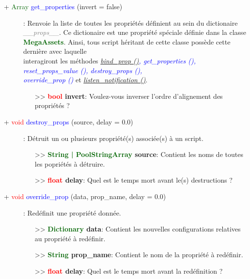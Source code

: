 \documentclass[a4paper, 11pt]{article}
\begin{document}
	\begin{description}
		\item [+ \textcolor{darkgreen}{Array} \textcolor{blue}{get\_properties} (invert = false)]: Renvoie 
		la liste de toutes les propriétés définient au sein du dictionaire \textit{\textcolor {gray}
		{\_\_props\_\_}}. Ce dictionaire est une propriété spéciale définie dans la classe 
		\textbf{\textcolor {darkgreen}{\\MegaAssets}}. Ainsi, tous script héritant de cette classe possède 
		cette dernière avec laquelle \\interagiront les méthodes \textit{\textcolor {blue}
		{\hyperlink{bindprop}{bind\_prop ()}, get\_properties (), reset\_props\_value (), destroy\_props (), 
		\\override\_prop ()}} et \textit{\textcolor {blue}{\hyperlink{listennotifications}
		{listen\_notification ()}}}.
		\begin{itemize}
			\item[>> \textbf{\textcolor{red}{bool} invert}:] Voulez-vous inverser l'ordre d'alignement des
			propriétés ?\\
		\end{itemize}
	\end{description}
	\begin{description}
		\item [+ \textcolor{red}{void} \textcolor{blue}{destroy\_props} (source, delay = 0.0)]: Détruit un 
		ou plusieurs propriété(s) associée(s) à un script.
		\begin{itemize}
			\item[>> \textbf{\textcolor{darkgreen}{String | PoolStringArray} source}:] Contient les noms de
			toutes les popriétés à détruire.
			\item[>> \textbf{\textcolor{red}{float} delay}:] Quel est le temps mort avant le(s) destructions
			?\\
		\end{itemize}
	\end{description}
	\begin{description}
		\item [+ \textcolor{red}{void} \textcolor{blue}{override\_prop} (data, prop\_name, delay = 0.0)]: 
		Redéfinit une propriété donnée.
		\begin{itemize}
			\item[>> \textbf{\textcolor{darkgreen}{Dictionary} data}:] Contient les nouvelles configurations
			relatives au propriété à redéfinir.
			\item[>> \textbf{\textcolor{darkgreen}{String} prop\_name}:] Contient le nom de la propriété à
			redéfinir.
			\item[>> \textbf{\textcolor{red}{float} delay}:] Quel est le temps mort avant la redéfinition ?
			\\
		\end{itemize}
	\end{description}
\end{document}
